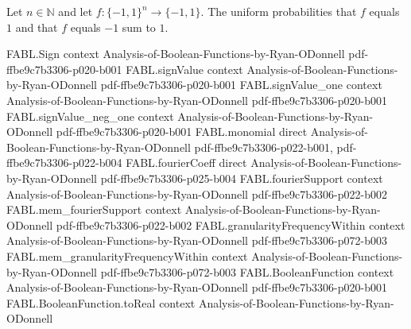 \begin{theorem}
\label{FABL.uniformProbability_one_add_neg_one_eq_one}
\leanok
{}
Let $n\in\mathbb{N}$ and let $f:\{−1,1\}^n\to\{−1,1\}$. The uniform probabilities that
$f$ equals $1$ and that $f$ equals $-1$ sum to $1$.
\end{theorem}

\begin{theorem}
\label{FABL.isBalanced_iff_uniformProbability_one_eq_half}
\leanok
{}
\proofstep
  {FABL.Sign}
  {context}
  {Analysis-of-Boolean-Functions-by-Ryan-ODonnell}
  {pdf-ffbe9c7b3306-p020-b001}
\proofstep
  {FABL.signValue}
  {context}
  {Analysis-of-Boolean-Functions-by-Ryan-ODonnell}
  {pdf-ffbe9c7b3306-p020-b001}
\proofstep
  {FABL.signValue_one}
  {context}
  {Analysis-of-Boolean-Functions-by-Ryan-ODonnell}
  {pdf-ffbe9c7b3306-p020-b001}
\proofstep
  {FABL.signValue_neg_one}
  {context}
  {Analysis-of-Boolean-Functions-by-Ryan-ODonnell}
  {pdf-ffbe9c7b3306-p020-b001}
\proofstep
  {FABL.monomial}
  {direct}
  {Analysis-of-Boolean-Functions-by-Ryan-ODonnell}
  {pdf-ffbe9c7b3306-p022-b001,
    pdf-ffbe9c7b3306-p022-b004}
\proofstep
  {FABL.fourierCoeff}
  {direct}
  {Analysis-of-Boolean-Functions-by-Ryan-ODonnell}
  {pdf-ffbe9c7b3306-p025-b004}
\proofstep
  {FABL.fourierSupport}
  {context}
  {Analysis-of-Boolean-Functions-by-Ryan-ODonnell}
  {pdf-ffbe9c7b3306-p022-b002}
\proofstep
  {FABL.mem_fourierSupport}
  {context}
  {Analysis-of-Boolean-Functions-by-Ryan-ODonnell}
  {pdf-ffbe9c7b3306-p022-b002}
\proofstep
  {FABL.granularityFrequencyWithin}
  {context}
  {Analysis-of-Boolean-Functions-by-Ryan-ODonnell}
  {pdf-ffbe9c7b3306-p072-b003}
\proofstep
  {FABL.mem_granularityFrequencyWithin}
  {context}
  {Analysis-of-Boolean-Functions-by-Ryan-ODonnell}
  {pdf-ffbe9c7b3306-p072-b003}
\proofstep
  {FABL.BooleanFunction}
  {context}
  {Analysis-of-Boolean-Functions-by-Ryan-ODonnell}
  {pdf-ffbe9c7b3306-p020-b001}
\proofstep
  {FABL.BooleanFunction.toReal}
  {context}
  {Analysis-of-Boolean-Functions-by-Ryan-ODonnell}

\end{theorem}
